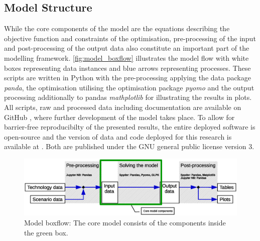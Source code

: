 \documentclass[article]{elsarticle}
\begin{document}
\subsection{Model Structure}
\label{subsec:Structure}
While the core components of the model are the equations describing the objective function and constraints of the optimisation, pre-processing of the input and post-processing of the output data also constitute an important part of the modelling framework. \autoref{fig:model_boxflow} illustrates the model flow with white boxes representing data instances and blue arrows representing processes. These scripts are written in Python with the pre-processing applying the data package \textit{panda}, the optimisation utilising the optimisation package \textit{pyomo} and the output processing additionally to pandas \textit{mathplotlib} for illustrating the results in plots. All scripts, raw and processed data including documentation are available on GitHub \cite{GitHub2018}, where further development of the model takes place. To allow for barrier-free reproducibilty of the presented results, the entire deployed software is open-source and the version of data and code deployed for this research is available at \cite{Zenodo2018}. Both are published under the GNU general public license version 3.

\begin{figure}[tbh]
    \centering
    \includegraphics[width=\textwidth]{figures/model_boxflow_paper.eps}
    \caption{Model boxflow: The core model consists of the components inside the green box.}
    \label{fig:model_boxflow}
\end{figure}
\end{document}
